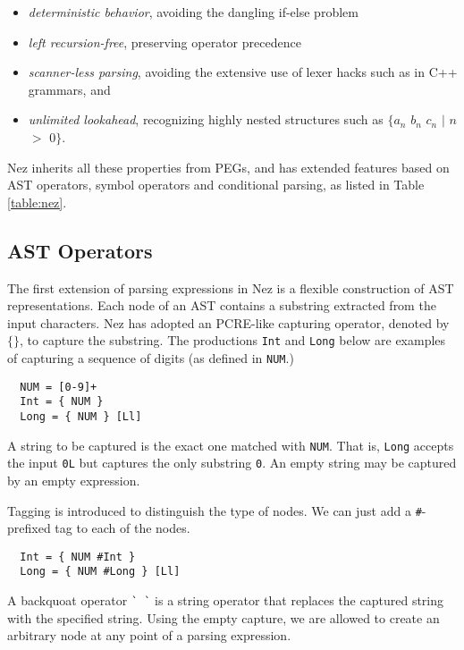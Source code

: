 \documentclass[preprint]{sigplanconf}
\begin{document}
\begin{itemize}
\item {\em deterministic behavior}, avoiding the dangling if-else problem
\item {\em left recursion-free}, preserving operator precedence
\item {\em scanner-less parsing}, avoiding the extensive use of lexer hacks such as in C++ grammars, and 
\item {\em unlimited lookahead}, recognizing highly nested structures such as  $\{a_n$ $b_n$ $c_n$ $|$ $n$ $>$ $0\}$. 
\end{itemize}

Nez inherits all these properties from PEGs, and has extended features based on AST operators, symbol operators and conditional parsing, as listed in Table \ref{table:nez}. 

\subsection{AST Operators}

The first extension of parsing expressions in Nez is a flexible construction of AST representations. Each node of an AST contains a substring extracted from the input characters. Nez has adopted an PCRE-like capturing operator, denoted by $\{ \}$, to capture the substring. The productions {\tt Int} and {\tt Long} below are examples of capturing a sequence of digits (as defined in {\tt NUM}.)

\begin{verbatim}
  NUM = [0-9]+
  Int = { NUM }
  Long = { NUM } [Ll]
\end{verbatim}

A string to be captured is the exact one matched with {\tt NUM}. That is, {\tt Long} accepts the input \verb|0L| but captures the only substring \verb|0|. An empty string may be captured by an empty expression. 

Tagging is introduced to distinguish the type of nodes. We can just add a \verb|#|-prefixed tag to each of the nodes. 

\begin{verbatim}
  Int = { NUM #Int }
  Long = { NUM #Long } [Ll]
\end{verbatim}

A backquoat operator \verb|` `| is a string operator that replaces the captured string with the specified string. Using the empty capture, we are allowed to create an arbitrary node at any point of a parsing expression.  
\end{document}
